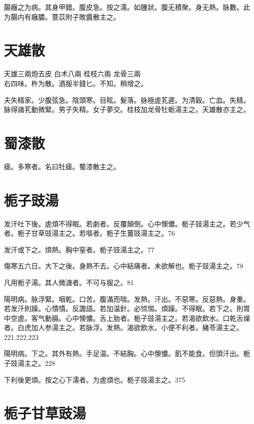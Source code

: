 腸癰之为病。其身甲錯。腹皮急。按之濡。如腫狀。腹无積聚。身无熱。脉數。此为腸内有{\khaaitp 癰}膿。薏苡附子敗醬散主之。

\section{天雄散}

天雄{\scriptsize 三兩炮去皮} 白术{\scriptsize 八兩} 桂枝{\scriptsize 六兩} 龙骨{\scriptsize 三兩}\\
右四味。杵为散。酒服半錢匕。不知。稍增之。

夫失精家。少腹弦急。陰頭寒。目眩。髮落。脉極虗芤遲。为清穀。亡血。失精。脉得諸芤動微緊。男子失精。女子夢交。桂枝加龙骨牡蛎湯主之。天雄散亦主之。

\section{蜀漆散}

瘧。多寒者。名曰牡瘧。蜀漆散主之。

\section{栀子豉湯}

发汗吐下後。虗煩不得眠。若劇者。反覆顛倒。心中懊憹。栀子{\khaaitp 豉}湯主之。若少气者。栀子甘草{\khaaitp 豉}湯主之。若嘔者。栀子生薑{\khaaitp 豉}湯主之。76

发汗或下之。煩熱。胸中窒者。栀子{\khaaitp 豉}湯主之。77

傷寒五六日。大下之後。身熱不去。心中結痛者。未欲解也。栀子{\khaaitp 豉}湯主之。78

凡用栀子湯。其人微溏者。不可与服之。81

陽明病。脉浮緊。咽乾。口苦。腹滿而喘。发熱。汗出。不惡寒。反惡熱。身重。若发汗則躁。心憒憒。反譫語。若加温針。必怵惕。煩躁。不得眠。若下之。則胃中空虗。客气動膈。心中懊憹。舌上胎者。栀子{\khaaitp 豉}湯主之。若渴欲飲水。口乾舌燥者。白虎{\khaaitp 加人参}湯主之。若脉浮。发熱。渴欲飲水。小便不利者。豬苓湯主之。221.222.223

陽明病。下之。其外有熱。手足温。不結胸。心中懊憹。飢不能食。但頭汗出。栀子{\khaaitp 豉}湯主之。228

下利後更煩。按之心下濡者。为虗煩也。栀子{\khaaitp 豉}湯主之。375

\section{栀子甘草豉湯}

